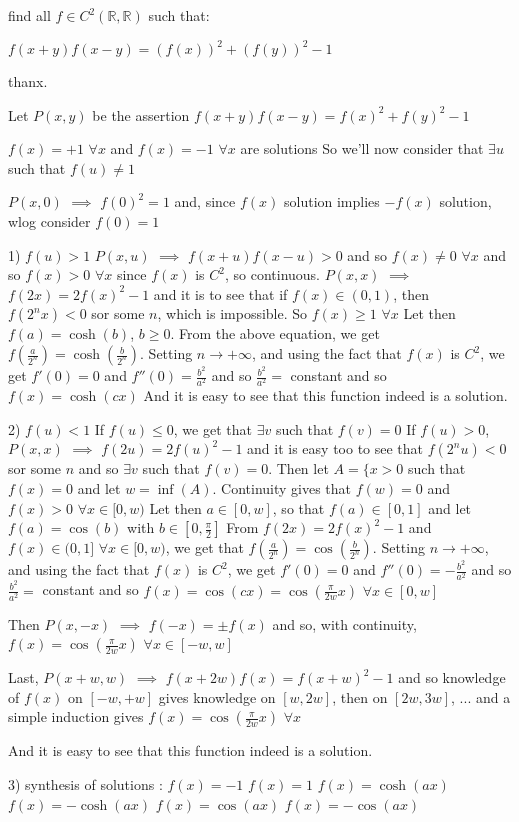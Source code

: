 \begin{solution}
	\begin{tcolorbox}find all $ f\in{C}^{2}(\mathbb{R},\mathbb{R})$ such that:

$ f(x + y)f(x - y) = (f(x))^{2} + (f(y))^{2} - 1$

thanx.\end{tcolorbox}
Let $ P(x,y)$ be the assertion $ f(x+y)f(x-y)=f(x)^2+f(y)^2-1$

$ f(x)=+1$ $ \forall x$ and $ f(x)=-1$ $ \forall x$ are solutions
So we'll now consider that $ \exists u$ such that $ f(u)\neq 1$

$ P(x,0)$ $ \implies$ $ f(0)^2=1$ and, since $ f(x)$ solution implies $ -f(x)$ solution, wlog consider $ f(0)=1$

1) $ f(u)>1$
$ P(x,u)$ $ \implies$ $ f(x+u)f(x-u)>0$ and so $ f(x)\neq0$ $ \forall x$ and so $ f(x)>0$ $ \forall x$ since $ f(x)$ is $ C^2$, so continuous.
$ P(x,x)$ $ \implies$ $ f(2x)=2f(x)^2-1$ and it is to see that if $ f(x)\in(0,1)$, then $ f(2^nx)<0$ sor some $ n$, which is impossible.
So $ f(x)\geq 1$ $ \forall x$
Let then $ f(a)=\cosh(b)$, $ b\geq 0$. From the above equation, we get $ f(\frac a{2^n})=\cosh(\frac b{2^n})$. 
Setting $ n\to+\infty$, and using the fact that $ f(x)$ is $ C^2$, we get $ f'(0)=0$ and $ f''(0)=\frac{b^2}{a^2}$ and so $ \frac{b^2}{a^2}=$ constant and so $ f(x)=\cosh(cx)$
And it is easy to see that this function indeed is a solution.

2) $ f(u)<1$
If $ f(u)\leq 0$, we get that $ \exists v$ such that $ f(v)=0$
If $ f(u)>0$, $ P(x,x)$ $ \implies$ $ f(2u)=2f(u)^2-1$ and it is easy too to see that $ f(2^nu)<0$ sor some $ n$ and so  $ \exists v$ such that $ f(v)=0$.
Then let $ A=\{x>0$ such that $ f(x)=0$ and let $ w=\inf(A)$. Continuity gives that $ f(w)=0$ and $ f(x)>0$ $ \forall x\in[0,w)$
Let then $ a\in[0,w]$, so that $ f(a)\in[0,1]$ and let $ f(a)=\cos(b)$ with $ b\in[0,\frac{\pi}2]$
From $ f(2x)=2f(x)^2-1$ and $ f(x)\in(0,1]$ $ \forall x\in[0,w)$, we get that $ f(\frac a{2^n})=\cos(\frac b{2^n})$.
Setting $ n\to+\infty$, and using the fact that $ f(x)$ is $ C^2$, we get $ f'(0)=0$ and $ f''(0)=-\frac{b^2}{a^2}$ and so $ \frac{b^2}{a^2}=$ constant and so $ f(x)=\cos(cx)=\cos(\frac{\pi}{2w}x)$ $ \forall x\in[0,w]$

Then $ P(x,-x)$ $ \implies$ $ f(-x)=\pm f(x)$ and so, with continuity, $ f(x)=\cos(\frac{\pi}{2w}x)$ $ \forall x\in[-w,w]$

Last, $ P(x+w,w)$ $ \implies$ $ f(x+2w)f(x)=f(x+w)^2-1$ and so knowledge of $ f(x)$ on $ [-w,+w]$ gives knowledge on $ [w,2w]$, then on $ [2w,3w]$, ... and a simple induction gives $ f(x)=\cos(\frac{\pi}{2w}x)$ $ \forall x$

And it is easy to see that this function indeed is a solution.

3) synthesis of solutions :
$ f(x)=-1$
$ f(x)=1$
$ f(x)=\cosh(ax)$
$ f(x)=-\cosh(ax)$
$ f(x)=\cos(ax)$
$ f(x)=-\cos(ax)$
\end{solution}



